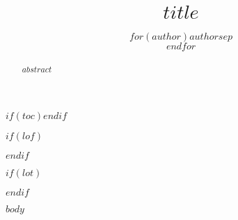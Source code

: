 \documentclass[AER, $if(draft)$draftmode$endif$]{templates/AEA}
\title{$title$}
\author{$for(author)$$author$$sep$ \\ $endfor$}
\begin{document}
\maketitle

\begin{abstract}
	$abstract$
\end{abstract}


$if(toc)$\tableofcontents$endif$

$if(lof)$
\listoffigures
$endif$

$if(lot)$
\listoftables
$endif$


$body$
\end{document}
